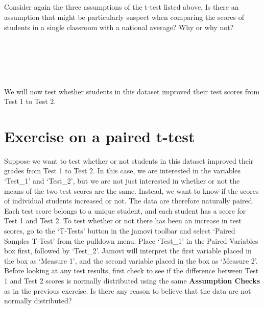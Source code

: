 \documentclass[
  openany]{krantz}
\begin{document}
\begin{verbatim}





\end{verbatim}

Consider again the three assumptions of the t-test listed above.
Is there an assumption that might be particularly suspect when comparing the scores of students in a single classroom with a national average?
Why or why not?

\begin{verbatim}





\end{verbatim}

We will now test whether students in this dataset improved their test scores from Test 1 to Test 2.

\hypertarget{exercise-on-a-paired-t-test}{%
\section{Exercise on a paired t-test}\label{exercise-on-a-paired-t-test}}

Suppose we want to test whether or not students in this dataset improved their grades from Test 1 to Test 2.
In this case, we are interested in the variables `Test\_1' and `Test\_2', but we are not just interested in whether or not the means of the two test scores are the same.
Instead, we want to know if the scores of individual students increased or not.
The data are therefore naturally paired.
Each test score belongs to a unique student, and each student has a score for Test 1 and Test 2.
To test whether or not there has been an increase in test scores, go to the `T-Tests' button in the jamovi toolbar and select `Paired Samples T-Test' from the pulldown menu.
Place `Test\_1' in the Paired Variables box first, followed by `Test\_2'.
Jamovi will interpret the first variable placed in the box as `Measure 1', and the second variable placed in the box as `Measure 2'.
Before looking at any test results, first check to see if the difference between Test 1 and Test 2 scores is normally distributed using the same \textbf{Assumption Checks} as in the previous exercise.
Is there any reason to believe that the data are not normally distributed?

\begin{verbatim}
\end{verbatim}
\end{document}
